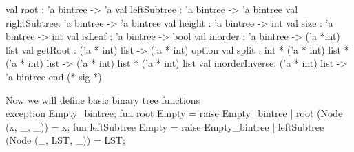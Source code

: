 \documentclass[10pt,a4paper]{article}%
\begin{document}
                val root : 'a bintree -> 'a
                val leftSubtree : 'a bintree -> 'a bintree
                val rightSubtree: 'a bintree -> 'a bintree
                val height : 'a bintree -> int
                val size : 'a bintree -> int
                val isLeaf : 'a bintree -> bool
                val inorder : 'a bintree -> ('a *int) list
                val getRoot : ('a * int) list -> ('a * int) option
                val split : int * ('a * int) list * ('a * int) list -> ('a * int) list * ('a * int) list
                val inorderInverse: ('a * int) list -> 'a bintree
        end (* sig *)
\nwendcode{}\nwdocspar

Now we will define basic binary tree functions\\
\nwenddocs{}\endmoddef\nwstartdeflinemarkup{}\nwenddeflinemarkup
exception Empty_bintree;
\nwendcode{}\nwdocspar
\nwenddocs{}\endmoddef\nwstartdeflinemarkup{}\nwenddeflinemarkup
fun root Empty = raise Empty_bintree
        | root (Node (x, _, _)) = x;
\nwendcode{}\nwdocspar
\nwenddocs{}\endmoddef\nwstartdeflinemarkup{}\nwenddeflinemarkup
fun leftSubtree Empty = raise Empty_bintree
        | leftSubtree (Node (_, LST, _)) = LST;
\nwendcode{}\nwdocspar
\nwenddocs{}\endmoddef\nwstartdeflinemarkup{}\nwenddeflinemarkup
\end{document}
